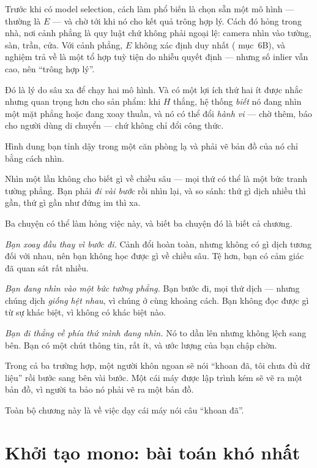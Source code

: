 \documentclass[../../vslam.tex]{subfiles}
\begin{document}
Trước khi có model selection, cách làm phổ biến là chọn sẵn một mô hình --- thường là \(E\) --- và chờ tới khi nó cho kết quả trông hợp lý. Cách đó hỏng trong nhà, nơi cảnh phẳng là quy luật chứ không phải ngoại lệ: camera nhìn vào tường, sàn, trần, cửa. Với cảnh phẳng, \(E\) không xác định duy nhất ( mục~6B), và nghiệm trả về là một tổ hợp tuỳ tiện do nhiễu quyết định --- nhưng số inlier vẫn cao, nên ``trông hợp lý''.

Đó là lý do sâu xa để chạy hai mô hình. Và có một lợi ích thứ hai ít được nhắc nhưng quan trọng hơn cho sản phẩm: khi \(H\) thắng, hệ thống \emph{biết} nó đang nhìn một mặt phẳng hoặc đang xoay thuần, và nó có thể đổi \emph{hành vi} --- chờ thêm, báo cho người dùng di chuyển --- chứ không chỉ đổi công thức.

\begin{trucgiac}
Hình dung bạn tỉnh dậy trong một căn phòng lạ và phải vẽ bản đồ của nó chỉ bằng cách nhìn.

Nhìn một lần không cho biết gì về chiều sâu --- mọi thứ có thể là một bức tranh tường phẳng. Bạn phải \emph{đi vài bước} rồi nhìn lại, và so sánh: thứ gì dịch nhiều thì gần, thứ gì gần như đứng im thì xa.

Ba chuyện có thể làm hỏng việc này, và biết ba chuyện đó là biết cả chương.

\emph{Bạn xoay đầu thay vì bước đi.} Cảnh đổi hoàn toàn, nhưng không có gì dịch tương đối với nhau, nên bạn không học được gì về chiều sâu. Tệ hơn, bạn có cảm giác đã quan sát rất nhiều.

\emph{Bạn đang nhìn vào một bức tường phẳng.} Bạn bước đi, mọi thứ dịch --- nhưng chúng dịch \emph{giống hệt nhau}, vì chúng ở cùng khoảng cách. Bạn không đọc được gì từ sự khác biệt, vì không có khác biệt nào.

\emph{Bạn đi thẳng về phía thứ mình đang nhìn.} Nó to dần lên nhưng không lệch sang bên. Bạn có một chút thông tin, rất ít, và ước lượng của bạn chập chờn.

Trong cả ba trường hợp, một người khôn ngoan sẽ nói ``khoan đã, tôi chưa đủ dữ liệu'' rồi bước sang bên vài bước. Một cái máy được lập trình kém sẽ vẽ ra một bản đồ, vì người ta bảo nó phải vẽ ra một bản đồ.

Toàn bộ chương này là về việc dạy cái máy nói câu ``khoan đã''.
\end{trucgiac}

\section{Khởi tạo mono: bài toán khó nhất}
\end{document}
